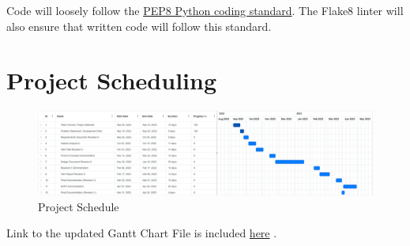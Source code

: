\documentclass{article}
\begin{document}
Code will loosely follow the \href{https://peps.python.org/pep-0008/}{PEP8 Python coding standard}.
The Flake8 linter will also ensure that written code will follow this standard.

\section{Project Scheduling}

\begin{figure}[H] 
\centering
\includegraphics[width=1\textwidth]{Project Scheduling} 
\caption{Project Schedule} 
\label{Fig.Project_Scheduling} 
\end{figure}

Link to the updated Gantt Chart File is included
\href{https://drive.google.com/drive/folders/1M7_SSWqj6OOr_dPLmK_PLzeFSMWgSP8d?usp=sharing}{here}
.
\end{document}
